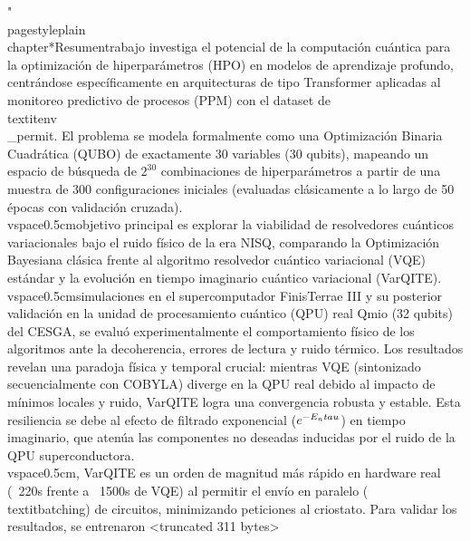 "\\pagestyle{plain}\n\\chapter*{Resumen}\n\nEste trabajo investiga el potencial de la computación cuántica para la optimización de hiperparámetros (HPO) en modelos de aprendizaje profundo, centrándose específicamente en arquitecturas de tipo Transformer aplicadas al monitoreo predictivo de procesos (PPM) con el dataset de \\textit{env\\_permit}. El problema se modela formalmente como una Optimización Binaria Cuadrática (QUBO) de exactamente 30 variables (30 qubits), mapeando un espacio de búsqueda de $2^{30}$ combinaciones de hiperparámetros a partir de una muestra de 300 configuraciones iniciales (evaluadas clásicamente a lo largo de 50 épocas con validación cruzada). \n\n\\vspace{0.5cm}\nEl objetivo principal es explorar la viabilidad de resolvedores cuánticos variacionales bajo el ruido físico de la era NISQ, comparando la Optimización Bayesiana clásica frente al algoritmo resolvedor cuántico variacional (VQE) estándar y la evolución en tiempo imaginario cuántico variacional (VarQITE).\n\n\\vspace{0.5cm}\nMediante simulaciones en el supercomputador FinisTerrae III y su posterior validación en la unidad de procesamiento cuántico (QPU) real Qmio (32 qubits) del CESGA, se evaluó experimentalmente el comportamiento físico de los algoritmos ante la decoherencia, errores de lectura y ruido térmico. Los resultados revelan una paradoja física y temporal crucial: mientras VQE (sintonizado secuencialmente con COBYLA) diverge en la QPU real debido al impacto de mínimos locales y ruido, VarQITE logra una convergencia robusta y estable. Esta resiliencia se debe al efecto de filtrado exponencial ($e^{-E_n\\tau}$) en tiempo imaginario, que atenúa las componentes no deseadas inducidas por el ruido de la QPU superconductora.\n\n\\vspace{0.5cm}\nAdicionalmente, VarQITE es un orden de magnitud más rápido en hardware real (~220s frente a ~1500s de VQE) al permitir el envío en paralelo (\\textit{batching}) de circuitos, minimizando peticiones al criostato. Para validar los resultados, se entrenaron 
<truncated 311 bytes>